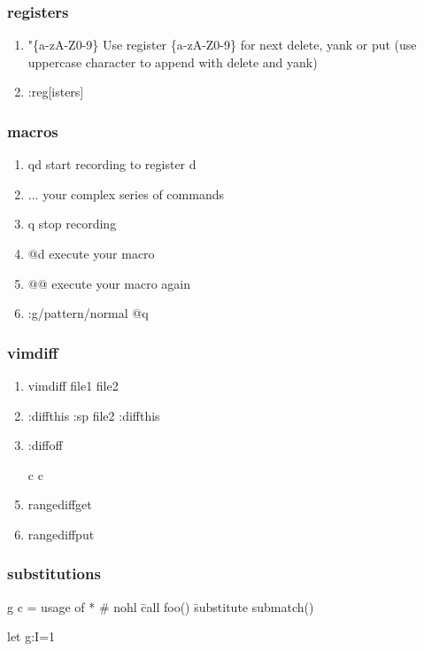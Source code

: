\documentclass{beamer}
\begin{document}
\begin{frame}
  \frametitle{registers}

  \begin{enumerate}
    \item "\{a-zA-Z0-9\}    Use register \{a-zA-Z0-9\} for next delete, yank or put (use uppercase character to append with delete and yank)
    \item :reg[isters]
  \end{enumerate}
\end{frame}

\begin{frame}
  \frametitle{macros}
  \begin{enumerate}
    \item qd    start recording to register d
    \item ...   your complex series of commands
    \item q     stop recording
    \item @d    execute your macro
    \item @@    execute your macro again
    \item :g/pattern/normal @q
  \end{enumerate}
\end{frame}

\begin{frame}
  \frametitle{vimdiff}
  \begin{enumerate}
    \item vimdiff file1 file2
    \item :diffthis :sp file2 :diffthis
    \item :diffoff
    \item [c ]c
    \item rangediffget
    \item rangediffput
  \end{enumerate}
\end{frame}

\begin{frame}
  \frametitle{substitutions}
      g c
      =
      usage of * \#
      nohl
      \= call foo()
      \= substitute
      submatch()

let g:I=1


\end{frame}
\end{document}
